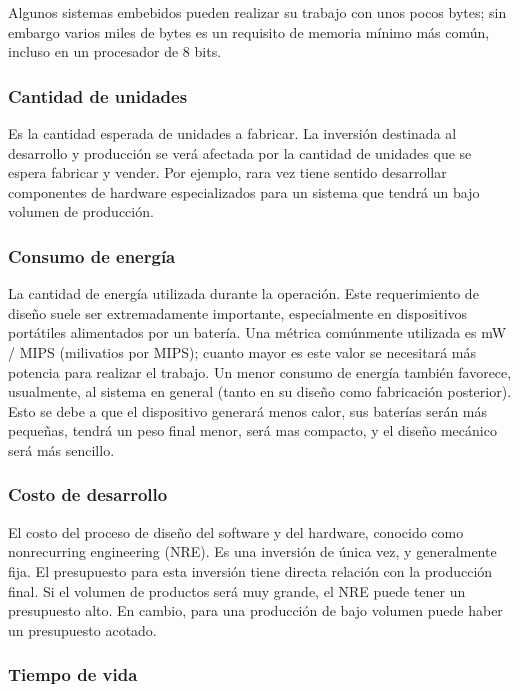 \documentclass[output=paper, 
colorlinks,
citecolor=brown,
newtxmath
]{langscibook}
\begin{document}
Algunos sistemas embebidos pueden realizar su trabajo
con unos pocos bytes; sin embargo varios miles de bytes es un requisito de
memoria mínimo más común, incluso en un procesador de 8 bits.


\subsubsection {Cantidad de unidades}

Es la cantidad esperada de unidades a fabricar. 
La inversión destinada al desarrollo y producción se verá afectada 
por la cantidad de unidades que se espera fabricar y vender.
Por ejemplo, rara vez tiene sentido desarrollar componentes de 
hardware especializados para un sistema que tendrá un bajo volumen de producción.


\subsubsection {Consumo de energía}

La cantidad de energía utilizada durante la operación. 
Este requerimiento de diseño suele ser extremadamente importante, 
especialmente en dispositivos portátiles alimentados por un batería. 
Una métrica comúnmente utilizada es mW / MIPS (milivatios por MIPS); 
cuanto mayor es este valor se necesitará más potencia para realizar el trabajo. 
Un menor consumo de energía también favorece, usualmente,
al sistema en general (tanto en su diseño como fabricación posterior). Esto
se debe a que el dispositivo generará menos calor, sus
baterías serán más pequeñas, tendrá un peso final menor, 
será mas compacto, y el diseño mecánico será más sencillo.


\subsubsection {Costo de desarrollo}

El costo del proceso de diseño del software y del hardware, conocido como nonrecurring engineering
(NRE). Es una inversión de única vez, y generalmente fija. El presupuesto para
esta inversión tiene directa relación con la producción final. Si el volumen de productos
será muy grande, el NRE puede tener un presupuesto alto. En cambio, para una producción
de bajo volumen puede haber un presupuesto acotado.


\subsubsection {Tiempo de vida}
\end{document}
